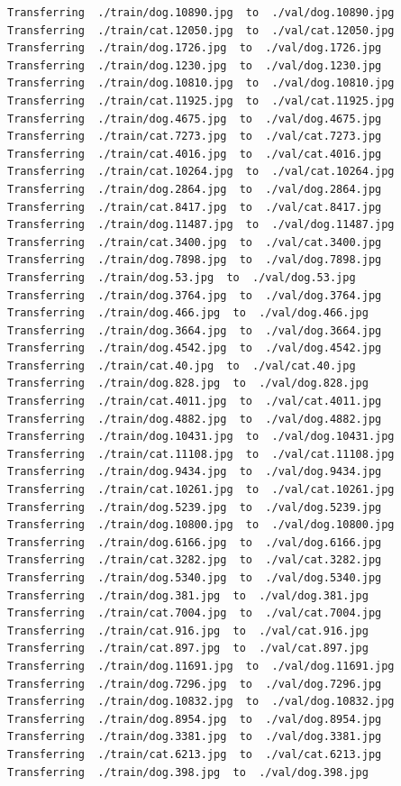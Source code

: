 \documentclass[]{book}
\theoremstyle{definition}
\theoremstyle{definition}
\theoremstyle{definition}
\theoremstyle{remark}
\begin{document}
\begin{verbatim}
Transferring  ./train/dog.10890.jpg  to  ./val/dog.10890.jpg
Transferring  ./train/cat.12050.jpg  to  ./val/cat.12050.jpg
Transferring  ./train/dog.1726.jpg  to  ./val/dog.1726.jpg
Transferring  ./train/dog.1230.jpg  to  ./val/dog.1230.jpg
Transferring  ./train/dog.10810.jpg  to  ./val/dog.10810.jpg
Transferring  ./train/cat.11925.jpg  to  ./val/cat.11925.jpg
Transferring  ./train/dog.4675.jpg  to  ./val/dog.4675.jpg
Transferring  ./train/cat.7273.jpg  to  ./val/cat.7273.jpg
Transferring  ./train/cat.4016.jpg  to  ./val/cat.4016.jpg
Transferring  ./train/cat.10264.jpg  to  ./val/cat.10264.jpg
Transferring  ./train/dog.2864.jpg  to  ./val/dog.2864.jpg
Transferring  ./train/cat.8417.jpg  to  ./val/cat.8417.jpg
Transferring  ./train/dog.11487.jpg  to  ./val/dog.11487.jpg
Transferring  ./train/cat.3400.jpg  to  ./val/cat.3400.jpg
Transferring  ./train/dog.7898.jpg  to  ./val/dog.7898.jpg
Transferring  ./train/dog.53.jpg  to  ./val/dog.53.jpg
Transferring  ./train/dog.3764.jpg  to  ./val/dog.3764.jpg
Transferring  ./train/dog.466.jpg  to  ./val/dog.466.jpg
Transferring  ./train/dog.3664.jpg  to  ./val/dog.3664.jpg
Transferring  ./train/dog.4542.jpg  to  ./val/dog.4542.jpg
Transferring  ./train/cat.40.jpg  to  ./val/cat.40.jpg
Transferring  ./train/dog.828.jpg  to  ./val/dog.828.jpg
Transferring  ./train/cat.4011.jpg  to  ./val/cat.4011.jpg
Transferring  ./train/dog.4882.jpg  to  ./val/dog.4882.jpg
Transferring  ./train/dog.10431.jpg  to  ./val/dog.10431.jpg
Transferring  ./train/cat.11108.jpg  to  ./val/cat.11108.jpg
Transferring  ./train/dog.9434.jpg  to  ./val/dog.9434.jpg
Transferring  ./train/cat.10261.jpg  to  ./val/cat.10261.jpg
Transferring  ./train/dog.5239.jpg  to  ./val/dog.5239.jpg
Transferring  ./train/dog.10800.jpg  to  ./val/dog.10800.jpg
Transferring  ./train/dog.6166.jpg  to  ./val/dog.6166.jpg
Transferring  ./train/cat.3282.jpg  to  ./val/cat.3282.jpg
Transferring  ./train/dog.5340.jpg  to  ./val/dog.5340.jpg
Transferring  ./train/dog.381.jpg  to  ./val/dog.381.jpg
Transferring  ./train/cat.7004.jpg  to  ./val/cat.7004.jpg
Transferring  ./train/cat.916.jpg  to  ./val/cat.916.jpg
Transferring  ./train/cat.897.jpg  to  ./val/cat.897.jpg
Transferring  ./train/dog.11691.jpg  to  ./val/dog.11691.jpg
Transferring  ./train/dog.7296.jpg  to  ./val/dog.7296.jpg
Transferring  ./train/dog.10832.jpg  to  ./val/dog.10832.jpg
Transferring  ./train/dog.8954.jpg  to  ./val/dog.8954.jpg
Transferring  ./train/dog.3381.jpg  to  ./val/dog.3381.jpg
Transferring  ./train/cat.6213.jpg  to  ./val/cat.6213.jpg
Transferring  ./train/dog.398.jpg  to  ./val/dog.398.jpg

\end{verbatim}
\end{document}
